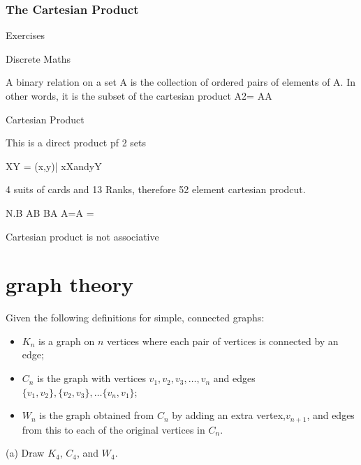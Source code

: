 \documentclass[]{report}
\begin{document}





\subsection{The Cartesian Product}
Exercises


 Discrete Maths
 
A binary relation on a set A is the collection of ordered pairs of elements of A. In other words, it is the subset of the cartesian product A2= AA

Cartesian Product
 
This is a direct product pf 2 sets
 
XY = {(x,y)| xXandyY }
 
4 suits of cards and 13 Ranks, therefore 52 element cartesian prodcut.
 
N.B         AB BA
              A=A =
 
Cartesian product is not associative
\chapter{graph theory }
Given the following definitions for simple, connected graphs:
\begin{itemize}
\item $K_n$ is a graph on $n$ vertices where each pair of vertices is connected by an edge;
\item $C_n$ is the graph with vertices $v_1, v_2, v_3, \dots, v_n$ and edges $\{v_1,v_2\}, \{v_2,v_3\}, \dots\{v_n, v_1\}$;
\item $W_n$ is the graph obtained from $C_n$ by adding an extra vertex,$v_{n+1}$, and edges
from this to each of the original vertices in $C_n$.
\end{itemize}
(a) Draw $K_4$, $C_4$, and $W_4$. 
\end{document}
